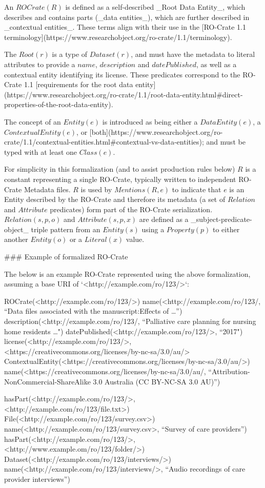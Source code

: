 \begin{markdown}
An $ROCrate(R)$ is defined as a self-described _Root Data Entity_, which describes and contains parts (_data entities_), which are further described in _contextual entities_.  These terms align with their use in the [RO-Crate 1.1 terminology](https://www.researchobject.org/ro-crate/1.1/terminology). 

The $Root(r)$ is a type of $Dataset(r)$, and must have the metadata to literal attributes to provide a $name$, $description$ and $datePublished$, as well as a contextual entity identifying its license. These predicates correspond to the RO-Crate 1.1 [requirements for the root data entity](https://www.researchobject.org/ro-crate/1.1/root-data-entity.html#direct-properties-of-the-root-data-entity).

The concept of an $Entity(e)$ is introduced as being either a $DataEntity(e)$, a $ContextualEntity(e)$, or [both](https://www.researchobject.org/ro-crate/1.1/contextual-entities.html#contextual-vs-data-entities); and must be typed with at least one $Class(e)$. 

For simplicity in this formalization (and to assist production rules below) $R$ is a constant representing a single RO-Crate, typically written to independent RO-Crate Metadata files. $R$ is used by $Mentions(R, e)$ to indicate that $e$ is an Entity described by the RO-Crate and therefore its metadata (a set of $Relation$ and $Attribute$ predicates) form part of the RO-Crate serialization. $Relation(s, p, o)$ and $Attribute(s, p, x)$ are defined as a _subject-predicate-object_ triple pattern from an $Entity(s)$ using a $Property(p)$ to either another $Entity(o)$ or a $Literal(x)$ value.
\end{markdown}

\begin{markdown}
### Example of formalized RO-Crate 

The below is an example RO-Crate represented using the above formalization, assuming a base URI of `<http://example.com/ro/123/>`:

    ROCrate(<http://example.com/ro/123/>)
    name(<http://example.com/ro/123/, 
        “Data files associated with the manuscript:Effects of …”)
    description(<http://example.com/ro/123/, 
        “Palliative care planning for nursing home residents …")
    datePublished(<http://example.com/ro/123/>, “2017")
    license(<http://example.com/ro/123/>, 
        <https://creativecommons.org/licenses/by-nc-sa/3.0/au/>
    ContextualEntity(<https://creativecommons.org/licenses/by-nc-sa/3.0/au/>)
    name(<https://creativecommons.org/licenses/by-nc-sa/3.0/au/, 
        “Attribution-NonCommercial-ShareAlike 3.0 Australia (CC BY-NC-SA 3.0 AU)”)

    hasPart(<http://example.com/ro/123/>, <http://example.com/ro/123/file.txt>)
    File(<http://example.com/ro/123/survey.csv>)
    name(<http://example.com/ro/123/survey.csv>, “Survey of care providers”)
    hasPart(<http://example.com/ro/123/>, <http://www.example.om/ro/123/folder/>)
    Dataset(<http://example.com/ro/123/interviews/>)
    name(<http://example.com/ro/123/interviews/>, 
        “Audio recordings of care provider interviews”)
\end{markdown}

